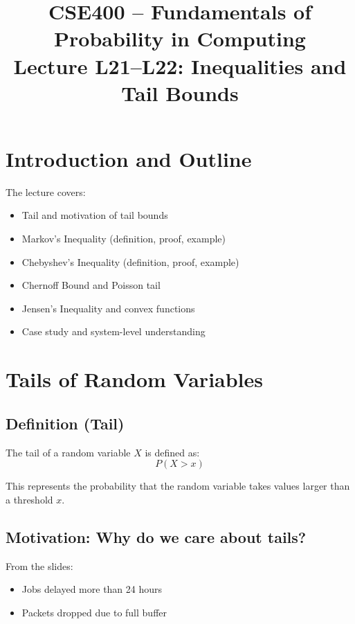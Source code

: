 \documentclass{article}
\begin{document}
\title{CSE400 – Fundamentals of Probability in Computing \\ Lecture L21–L22: Inequalities and Tail Bounds}
\date{}
\maketitle

\section{Introduction and Outline}

The lecture covers:
\begin{itemize}
    \item Tail and motivation of tail bounds
    \item Markov’s Inequality (definition, proof, example)
    \item Chebyshev’s Inequality (definition, proof, example)
    \item Chernoff Bound and Poisson tail
    \item Jensen’s Inequality and convex functions
    \item Case study and system-level understanding
\end{itemize}

\section{Tails of Random Variables}

\subsection{Definition (Tail)}

The tail of a random variable $X$ is defined as:
\begin{equation}
P(X > x)
\end{equation}

This represents the probability that the random variable takes values larger than a threshold $x$.

\subsection{Motivation: Why do we care about tails?}

From the slides:
\begin{itemize}
    \item Jobs delayed more than 24 hours
    \item Packets dropped due to full buffer
\end{itemize}
\end{document}
